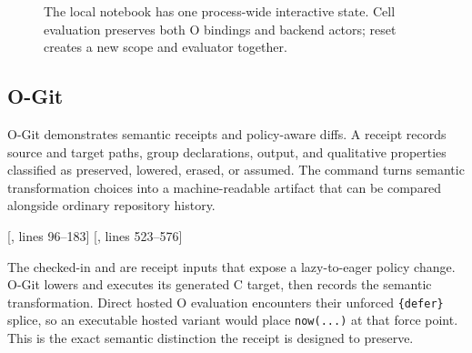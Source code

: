 \documentclass[11pt,oneside]{article}
\newcommand{\src}[2]{\textcolor{OSlate}{\scriptsize[\path{#1}, lines #2]}\allowbreak}
\begin{document}
\begin{figure}[htbp]
\centering
{}
\caption{The local notebook has one process-wide interactive state. Cell
evaluation preserves both O bindings and backend actors; reset creates a new
scope and evaluator together.}
\label{fig:notebook-state}
\end{figure}

\subsection{O-Git}

O-Git demonstrates semantic receipts and policy-aware diffs. A receipt records
source and target paths, group declarations, output, and qualitative
properties classified as preserved, lowered, erased, or assumed. The command
turns semantic transformation choices into a machine-readable artifact that
can be compared alongside ordinary repository history.
\par\src{src/bin/ogit.rs}{96--183}\quad
\src{src/bin/ogit.rs}{523--576}

The checked-in  and
 are receipt inputs that expose a lazy-to-eager policy
change. O-Git lowers and executes its generated C target, then records the
semantic transformation. Direct hosted O evaluation encounters their
unforced \texttt{\{defer\}} splice, so an executable hosted variant would place
\texttt{now(...)} at that force point. This is the exact semantic distinction
the receipt is designed to preserve.
\end{document}
